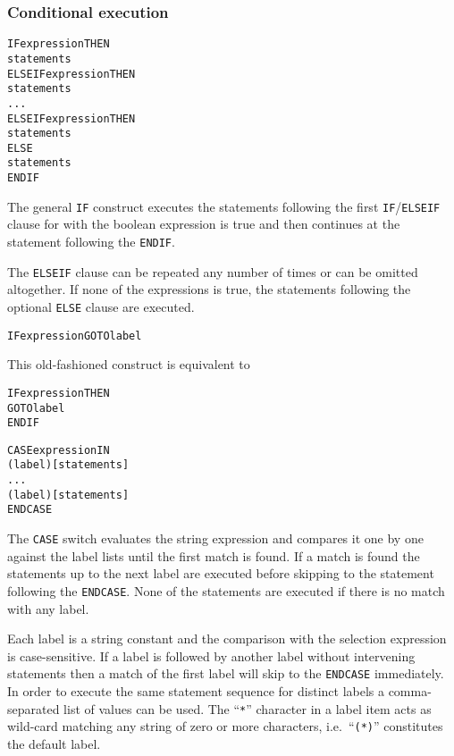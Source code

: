 \subsubsection{Conditional execution}

\begin{alltt}
IF expression THEN
   statements
ELSEIF expression THEN
   statements
...
ELSEIF expression THEN
   statements
ELSE
   statements
ENDIF
\end{alltt}
The general \texttt{IF} construct executes the statements following the
first \texttt{IF}/\texttt{ELSEIF} clause for with the boolean expression is
true and then continues at the statement following the \texttt{ENDIF}.

The \texttt{ELSEIF} clause can be repeated any number of times or can be
omitted altogether.
If none of the expressions is true, the statements following the
optional \texttt{ELSE} clause are executed.
 

\begin{alltt}
IF expression GOTO label
\end{alltt}
This old-fashioned construct is equivalent to
\begin{alltt}
IF expression THEN
   GOTO label
ENDIF
\end{alltt}


\label{ref:CASE}
 
 
\begin{alltt}
CASE expression IN
(label)  [ statements ]
...
(label)  [ statements ]
ENDCASE
\end{alltt}
The \texttt{CASE} switch evaluates the string expression and compares it
one by one against the label lists until the first match is found.
If a match is found the statements up to the next label are
executed before skipping to the statement following the \texttt{ENDCASE}.
None of the statements are executed if there is no match with any label.

Each label is a string constant and the comparison with the selection
expression is case-sensitive.
If a label is followed by another label without intervening statements
then a match of the first label will skip to the \texttt{ENDCASE} immediately.
In order to execute the same statement sequence for distinct labels
a comma-separated list of values can be used.
The ``\texttt{*}'' character in a label item acts as wild-card matching any
string of zero or more characters, i.e.\ ``\texttt{(*)}'' constitutes the
default label.
 
